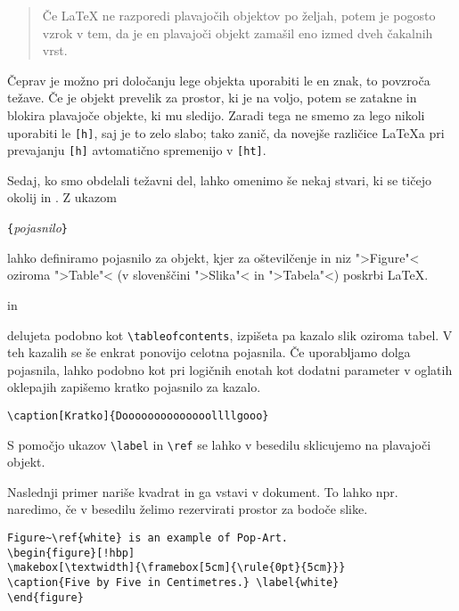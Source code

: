 \begin{quote}
Če \LaTeX{} ne razporedi plavajočih objektov po željah, potem je pogosto vzrok
v tem, da je en plavajoči objekt zamašil eno izmed dveh čakalnih vrst.
\end{quote}     

Čeprav je možno pri določanju lege objekta uporabiti le  en znak, to povzroča težave.
Če je objekt prevelik za prostor, ki je na voljo, potem se zatakne in blokira 
plavajoče objekte, ki mu sledijo.
Zaradi tega ne smemo za lego nikoli uporabiti le \verb|[h]|, saj je to zelo 
slabo; tako zanič, da novejše različice \LaTeX{a} pri prevajanju \verb|[h]| avtomatično
spremenijo v \verb|[ht]|.

\bigskip
\noindent Sedaj, ko smo obdelali težavni del, lahko omenimo še nekaj 
stvari, ki se tičejo okolij  in . Z ukazom

\begin{lscommand}
\verb|{|\emph{pojasnilo}\verb|}|
\end{lscommand}

\noindent lahko definiramo pojasnilo za objekt, kjer za oštevilčenje in 
niz ">Figure"< oziroma ">Table"< (v slovenščini ">Slika"< in ">Tabela"<) poskrbi \LaTeX.


\begin{lscommand}
 in  
\end{lscommand}

\noindent delujeta podobno kot \verb|\tableofcontents|,
izpišeta pa kazalo slik oziroma tabel. V teh kazalih se še enkrat ponovijo celotna pojasnila.
Če uporabljamo dolga pojasnila, lahko podobno kot pri logičnih enotah kot dodatni parameter
v oglatih oklepajih zapišemo kratko pojasnilo za kazalo.
\begin{code}
\verb|\caption[Kratko]{Doooooooooooooollllgooo}| 
\end{code}

S pomočjo ukazov \verb|\label| in \verb|\ref| se lahko v besedilu sklicujemo na plavajoči objekt. 

Naslednji primer nariše kvadrat in ga vstavi v dokument. To lahko npr. naredimo,
če v besedilu želimo rezervirati prostor za bodoče slike.

\begin{code}
\begin{verbatim}
Figure~\ref{white} is an example of Pop-Art.
\begin{figure}[!hbp]
\makebox[\textwidth]{\framebox[5cm]{\rule{0pt}{5cm}}}
\caption{Five by Five in Centimetres.} \label{white}
\end{figure}
\end{verbatim}
\end{code}

